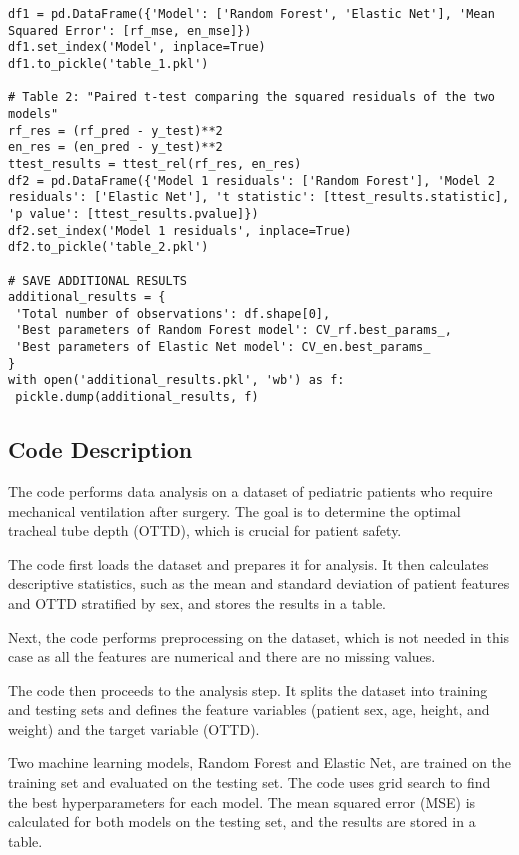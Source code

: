 \documentclass[11pt]{article}
\begin{document}
\begin{verbatim}
df1 = pd.DataFrame({'Model': ['Random Forest', 'Elastic Net'], 'Mean Squared Error': [rf_mse, en_mse]})
df1.set_index('Model', inplace=True)
df1.to_pickle('table_1.pkl')

# Table 2: "Paired t-test comparing the squared residuals of the two models"
rf_res = (rf_pred - y_test)**2
en_res = (en_pred - y_test)**2
ttest_results = ttest_rel(rf_res, en_res)
df2 = pd.DataFrame({'Model 1 residuals': ['Random Forest'], 'Model 2 residuals': ['Elastic Net'], 't statistic': [ttest_results.statistic], 'p value': [ttest_results.pvalue]})
df2.set_index('Model 1 residuals', inplace=True)
df2.to_pickle('table_2.pkl')

# SAVE ADDITIONAL RESULTS
additional_results = {
 'Total number of observations': df.shape[0], 
 'Best parameters of Random Forest model': CV_rf.best_params_,
 'Best parameters of Elastic Net model': CV_en.best_params_
}
with open('additional_results.pkl', 'wb') as f:
 pickle.dump(additional_results, f)

\end{verbatim}

\subsection{Code Description}

The code performs data analysis on a dataset of pediatric patients who require mechanical ventilation after surgery. The goal is to determine the optimal tracheal tube depth (OTTD), which is crucial for patient safety.

The code first loads the dataset and prepares it for analysis. It then calculates descriptive statistics, such as the mean and standard deviation of patient features and OTTD stratified by sex, and stores the results in a table.

Next, the code performs preprocessing on the dataset, which is not needed in this case as all the features are numerical and there are no missing values.

The code then proceeds to the analysis step. It splits the dataset into training and testing sets and defines the feature variables (patient sex, age, height, and weight) and the target variable (OTTD). 

Two machine learning models, Random Forest and Elastic Net, are trained on the training set and evaluated on the testing set. The code uses grid search to find the best hyperparameters for each model. The mean squared error (MSE) is calculated for both models on the testing set, and the results are stored in a table.
\end{document}
